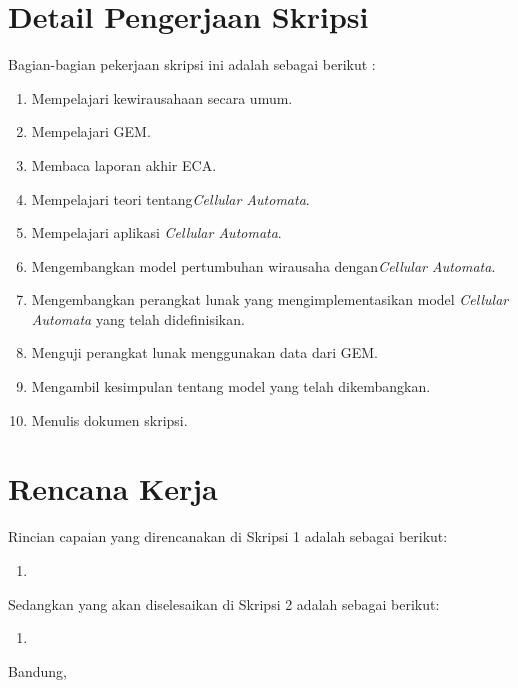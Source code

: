 \documentclass[a4paper,twoside]{article}
\begin{document}
\section{Detail Pengerjaan Skripsi}
Bagian-bagian pekerjaan skripsi ini adalah sebagai berikut :
	\begin{enumerate}
		\item Mempelajari kewirausahaan secara umum.
		\item Mempelajari GEM.
		\item Membaca laporan akhir ECA.
		\item Mempelajari teori tentang\textit{Cellular Automata}.
		\item Mempelajari aplikasi \textit{Cellular Automata}.
		\item Mengembangkan model pertumbuhan wirausaha dengan\textit{Cellular Automata}.
		\item Mengembangkan perangkat lunak yang mengimplementasikan model \textit{Cellular Automata} yang telah didefinisikan.
		\item Menguji perangkat lunak menggunakan data dari GEM.
		\item Mengambil kesimpulan tentang model yang telah dikembangkan.
		\item Menulis dokumen skripsi.
	\end{enumerate}

\section{Rencana Kerja}
Rincian capaian yang direncanakan di Skripsi 1 adalah sebagai berikut:
\begin{enumerate}
	\item
\end{enumerate}
Sedangkan yang akan diselesaikan di Skripsi 2 adalah sebagai berikut:
\begin{enumerate}
	\item
\end{enumerate}


\vspace{1cm}
\centering Bandung, \tanggal\\
\vspace{2cm} \nama \\ 
\vspace{1cm}
\end{document}
